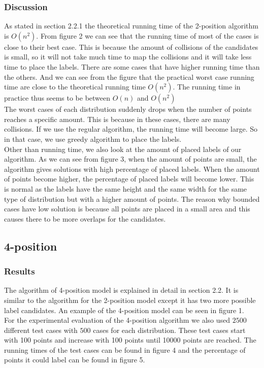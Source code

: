 \documentclass[crop=false,a4paper,oneside,11pt]{standalone}
\begin{document}
\subsubsection{Discussion}
As stated in section 2.2.1 the theoretical running time of the 2-position algorithm is $O(n^2)$. From figure 2 we can see that the running time of most of the cases is close to their best case. This is because the amount of collisions of the candidates is small, so it will not take much time to map the collisions and it will take less time to place the labels. There are some cases that have higher running time than the others. And we can see from the figure that the practical worst case running time are close to the theoretical running time $O(n^2)$. The running time in practice thus seems to be between $O(n)$ and $O(n^2)$ \\
The worst cases of each distribution suddenly drops when the number of points reaches a specific amount. This is because in these cases, there are many collisions. If we use the regular algorithm, the running time will become large. So in that case, we use greedy algorithm to place the labels.\\
Other than running time, we also look at the amount of placed labels of our algorithm. As we can see from figure 3, when the amount of points are small, the algorithm gives solutions with high percentage of placed labels. When the amount of points become higher, the percentage of placed labels will become lower. This is normal as the labels have the same height and the same width for the same type of distribution but with a higher amount of points. The reason why bounded cases have low solution is because all points are placed in a small area and this causes there to be more overlaps for the candidates.\\


\subsection{4-position}
\subsubsection{Results}
The algorithm of 4-position model is explained in detail in section 2.2. It is similar to the algorithm for the 2-position model except it has two more possible label candidates. An example of the 4-position model can be seen in figure 1.\\
 For the experimental evaluation of the 4-position algorithm we also used $2500$ different test cases with $500$ cases for each distribution. These test cases start with 100 points and increase with 100 points until 10000 points are reached. The running times of the test cases can be found in figure 4 and the percentage of points it could label can be found in figure 5.\\
\end{document}

